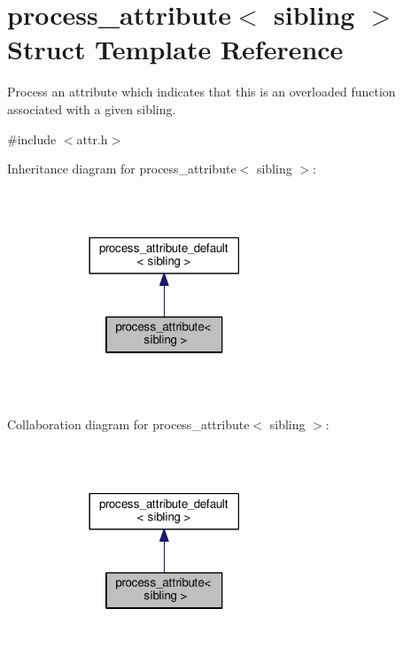 \hypertarget{structprocess__attribute_3_01sibling_01_4}{}\section{process\+\_\+attribute$<$ sibling $>$ Struct Template Reference}
\label{structprocess__attribute_3_01sibling_01_4}


Process an attribute which indicates that this is an overloaded function associated with a given sibling.  




{\ttfamily \#include $<$attr.\+h$>$}



Inheritance diagram for process\+\_\+attribute$<$ sibling $>$\+:
\nopagebreak
\begin{figure}[H]
\begin{center}
\leavevmode
\includegraphics[width=206pt]{structprocess__attribute_3_01sibling_01_4__inherit__graph}
\end{center}
\end{figure}


Collaboration diagram for process\+\_\+attribute$<$ sibling $>$\+:
\nopagebreak
\begin{figure}[H]
\begin{center}
\leavevmode
\includegraphics[width=206pt]{structprocess__attribute_3_01sibling_01_4__coll__graph}
\end{center}
\end{figure}
